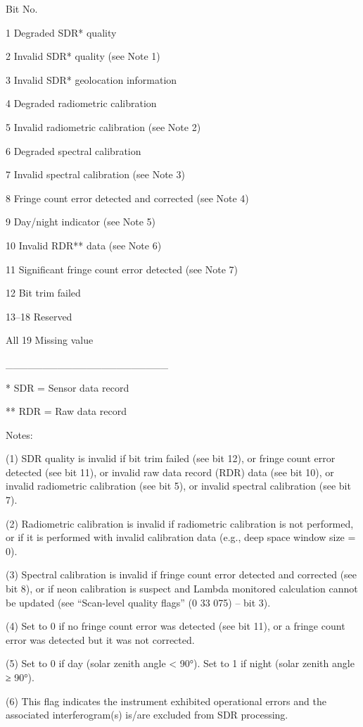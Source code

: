 Bit No.

1 Degraded SDR* quality

2 Invalid SDR* quality (see Note 1)

3 Invalid SDR* geolocation information

4 Degraded radiometric calibration

5 Invalid radiometric calibration (see Note 2)

6 Degraded spectral calibration

7 Invalid spectral calibration (see Note 3)

8 Fringe count error detected and corrected (see Note 4)

9 Day/night indicator (see Note 5)

10 Invalid RDR** data (see Note 6)

11 Significant fringe count error detected (see Note 7)

12 Bit trim failed

13--18 Reserved

All 19 Missing value

\_\_\_\_\_\_\_\_\_\_\_\_\_\_\_\_\_\_\_\_\_\_

* SDR = Sensor data record

** RDR = Raw data record

Notes:

(1) SDR quality is invalid if bit trim failed (see bit 12), or fringe count error detected (see bit 11), or invalid raw data record (RDR) data (see bit 10), or invalid radiometric calibration (see bit 5), or invalid spectral calibration (see bit 7).

(2) Radiometric calibration is invalid if radiometric calibration is not performed, or if it is performed with invalid calibration data (e.g., deep space window size = 0).

(3) Spectral calibration is invalid if fringe count error detected and corrected (see bit 8), or if neon calibration is suspect and Lambda monitored calculation cannot be updated (see ``Scan-level quality flags'' (0 33 075) -- bit 3).

(4) Set to 0 if no fringe count error was detected (see bit 11), or a fringe count error was detected but it was not corrected.

(5) Set to 0 if day (solar zenith angle \textless{} 90°). Set to 1 if night (solar zenith angle ≥ 90°).

(6) This flag indicates the instrument exhibited operational errors and the associated interferogram(s) is/are excluded from SDR processing.

